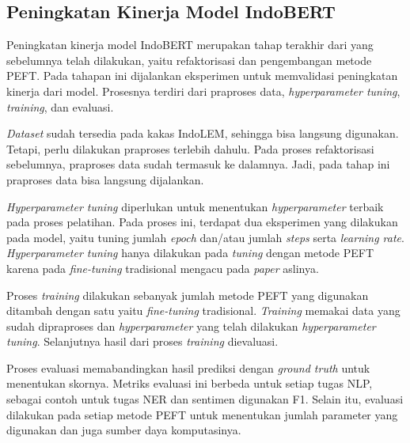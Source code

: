 \subsection{Peningkatan Kinerja Model IndoBERT}

Peningkatan kinerja model IndoBERT merupakan tahap terakhir dari yang sebelumnya telah dilakukan, yaitu refaktorisasi dan pengembangan metode PEFT. Pada tahapan ini  dijalankan eksperimen untuk memvalidasi peningkatan kinerja dari model. Prosesnya terdiri dari praproses data, \textit{hyperparameter tuning}, \textit{training}, dan evaluasi. 

\textit{Dataset} sudah tersedia pada kakas IndoLEM, sehingga bisa langsung digunakan. Tetapi, perlu dilakukan praproses terlebih dahulu. Pada proses refaktorisasi sebelumnya, praproses data sudah termasuk ke dalamnya. Jadi, pada tahap ini praproses data bisa langsung dijalankan.

\textit{Hyperparameter tuning} diperlukan untuk menentukan \textit{hyperparameter} terbaik pada proses pelatihan. Pada proses ini, terdapat dua eksperimen yang dilakukan pada model, yaitu tuning jumlah \textit{epoch} dan/atau jumlah \textit{steps} serta \textit{learning rate}. \textit{Hyperparameter tuning} hanya dilakukan pada \textit{tuning} dengan metode PEFT karena pada \textit{fine-tuning} tradisional  mengacu pada \textit{paper} aslinya.

Proses \textit{training}  dilakukan sebanyak jumlah metode PEFT yang digunakan ditambah dengan satu yaitu \textit{fine-tuning} tradisional. \textit{Training}  memakai data yang sudah dipraproses dan \textit{hyperparameter} yang telah dilakukan \textit{hyperparameter tuning}. Selanjutnya hasil dari proses \textit{training}  dievaluasi.

Proses evaluasi  memabandingkan hasil prediksi dengan \textit{ground truth} untuk menentukan skornya. Metriks evaluasi ini  berbeda untuk setiap tugas NLP, sebagai contoh untuk tugas NER dan sentimen  digunakan F1. Selain itu, evaluasi  dilakukan pada setiap metode PEFT untuk menentukan jumlah parameter yang digunakan dan juga sumber daya komputasinya. 
